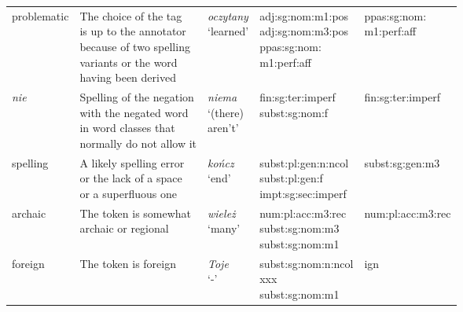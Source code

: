 \begin{longtable}[H]{p{2cm}p{4cm}p{1.5cm}p{3cm}p{3cm}}
problematic & \makecell[l]{The choice of the tag \\ is up to the annotator \\ because of two spelling \\ variants or the word \\ having been derived} & \makecell[l]{\textit{oczytany} \\ `learned'} & \makecell[l]{adj:sg:nom:m1:pos\\ adj:sg:nom:m3:pos \\ ppas:sg:nom:\\\hspace{0.5cm}m1:perf:aff} & \makecell[l]{ppas:sg:nom:\\\hspace{0.5cm}m1:perf:aff} \\ 

\textit{nie} & \makecell[l]{Spelling of the negation \\ with the negated word \\ in word classes that \\ normally do not allow it} & \makecell[l]{\textit{niema} \\ `(there) \\ aren't'} & \makecell[l]{fin:sg:ter:imperf \\ subst:sg:nom:f} & fin:sg:ter:imperf  \\ 

spelling & \makecell[l]{A likely spelling error \\ or the lack of a space \\ or a superfluous one} & \makecell[l]{\textit{kończ} \\ `end'} & \makecell[l]{subst:pl:gen:n:ncol \\ subst:pl:gen:f \\ impt:sg:sec:imperf} & subst:sg:gen:m3 \\ 

archaic & \makecell[l]{The token is somewhat \\ archaic or regional} & \makecell[l]{\textit{wieleż} \\ `many'} & \makecell[l]{num:pl:acc:m3:rec \\ subst:sg:nom:m3 \\ subst:sg:nom:m1} & num:pl:acc:m3:rec \\ 

foreign & The token is foreign & \makecell[l]{\textit{Toje} \\ `-'} & \makecell[l]{subst:sg:nom:n:ncol \\ xxx \\ subst:sg:nom:m1} & ign \\ 


\end{longtable}
